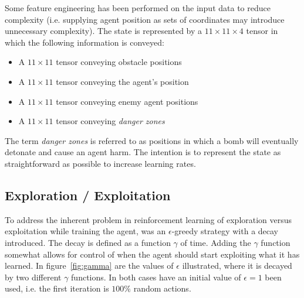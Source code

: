 Some feature engineering has been performed on the input data to reduce complexity (i.e. supplying agent position as sets of coordinates may introduce unnecessary complexity). The state is represented by a $11\times 11\times 4$ tensor in which the following information is conveyed:
\begin{itemize}
    \item A $11\times 11$ tensor conveying obstacle positions
    \item A $11\times 11$ tensor conveying the agent's position
    \item A $11\times 11$ tensor conveying enemy agent positions
    \item A $11\times 11$ tensor conveying \emph{danger zones}
\end{itemize}
The term \emph{danger zones} is referred to as positions in which a bomb will eventually detonate and cause an agent harm. The intention is to represent the state as straightforward as possible to increase learning rates.


\subsection{Exploration / Exploitation}
To address the inherent problem in reinforcement learning of exploration versus exploitation while training the agent, was an $\epsilon$-greedy strategy with a decay introduced. The decay is defined as a function $\gamma$ of time.\cite{nieuwdorp2017dare} Adding the $\gamma$ function somewhat allows for control of when the agent should start exploiting what it has learned. In figure~\ref{fig:gamma} are the values of $\epsilon$ illustrated, where it is decayed by two different $\gamma$ functions. In both cases have an initial value of $\epsilon=1$ been used, i.e. the first iteration is $100\%$ random actions.

